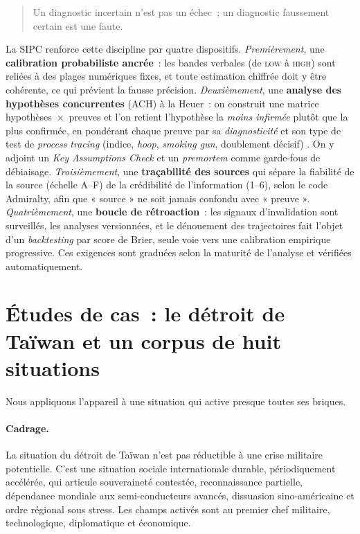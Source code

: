\documentclass[11pt,a4paper]{article}
\begin{document}
\begin{quote}
Un diagnostic incertain n'est pas un échec~; un diagnostic faussement certain est une faute.
\end{quote}

La SIPC renforce cette discipline par quatre dispositifs. \emph{Premièrement}, une
\textbf{calibration probabiliste ancrée}~: les bandes verbales (de \textsc{low} à \textsc{high})
sont reliées à des plages numériques fixes, et toute estimation chiffrée doit y être cohérente,
ce qui prévient la fausse précision. \emph{Deuxièmement}, une \textbf{analyse des hypothèses
concurrentes} (ACH) à la Heuer~: on construit une matrice hypothèses~$\times$~preuves et l'on
retient l'hypothèse la \emph{moins infirmée} plutôt que la plus confirmée, en pondérant chaque
preuve par sa \emph{diagnosticité} et son type de test de \emph{process tracing} (indice,
\emph{hoop}, \emph{smoking gun}, doublement décisif) \autocite{beachPedersen2013}. On y adjoint
un \emph{Key Assumptions Check} et un \emph{premortem} comme garde-fous de débiaisage.
\emph{Troisièmement}, une \textbf{traçabilité des sources} qui sépare la fiabilité de la source
(échelle A--F) de la crédibilité de l'information (1--6), selon le code Admiralty, afin que
« source » ne soit jamais confondu avec « preuve ». \emph{Quatrièmement}, une \textbf{boucle de
rétroaction}~: les signaux d'invalidation sont surveillés, les analyses versionnées, et le
dénouement des trajectoires fait l'objet d'un \emph{backtesting} par score de Brier, seule voie
vers une calibration empirique progressive. Ces exigences sont graduées selon la maturité de
l'analyse et vérifiées automatiquement.

\section{Études de cas~: le détroit de Taïwan et un corpus de huit situations}
\label{sec:taiwan}

Nous appliquons l'appareil à une situation qui active presque toutes ses briques.

\paragraph{Cadrage.} La situation du détroit de Taïwan n'est pas réductible à une crise
militaire potentielle. C'est une situation sociale internationale durable, périodiquement
accélérée, qui articule souveraineté contestée, reconnaissance partielle, dépendance mondiale
aux semi-conducteurs avancés, dissuasion sino-américaine et ordre régional sous stress. Les
champs activés sont au premier chef militaire, technologique, diplomatique et économique.
\end{document}
